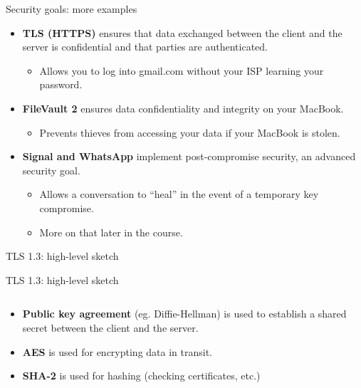 \documentclass[aspectratio=169, lualatex, handout]{beamer}
\begin{document}
\begin{frame}{Security goals: more examples}
	\begin{itemize}
		\item \textbf{TLS (HTTPS)} ensures that data exchanged between the client
		      and the server is confidential and that parties are authenticated.
		      \begin{itemize}
			      \item Allows you to log into gmail.com without your ISP learning your password.
		      \end{itemize}
		\item \textbf{FileVault 2} ensures data confidentiality and integrity on
		      your MacBook.
		      \begin{itemize}
			      \item Prevents thieves from accessing your data if your MacBook is stolen.
		      \end{itemize}
		\item \textbf{Signal and WhatsApp} implement post-compromise security, an advanced security
		      goal.
		      \begin{itemize}
			      \item Allows a conversation to ``heal'' in the event of a temporary key
			            compromise.

			      \item More on that later in the course.
		      \end{itemize}
	\end{itemize}
\end{frame}

\begin{frame}{TLS 1.3: high-level sketch}
\end{frame}

\begin{frame}{TLS 1.3: high-level sketch}
	\begin{columns}[c]
		\begin{column}{0.5\textwidth}
			\begin{itemize}[<+->]
				\item \textbf{Public key agreement} (eg. Diffie-Hellman) is used to establish
				      a shared secret between the client and the server.
				\item \textbf{AES} is used for encrypting data in transit.
				\item \textbf{SHA-2} is used for hashing (checking certificates, etc.)
			\end{itemize}
		\end{column}

		\begin{column}{0.5\textwidth}
		\end{column}
	\end{columns}
\end{frame}
\end{document}
